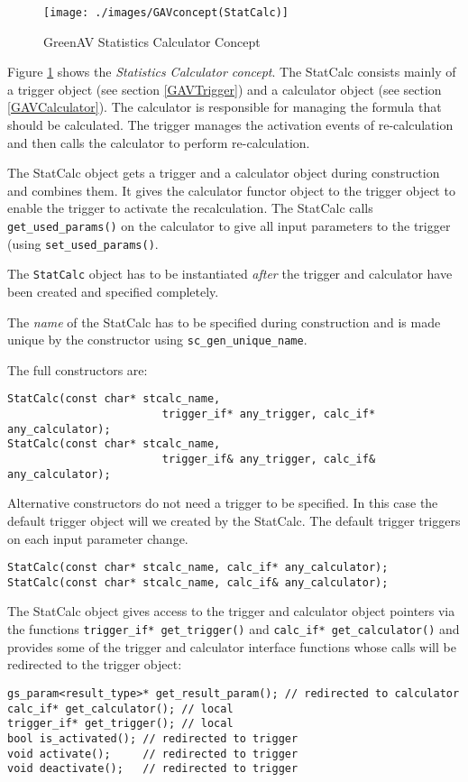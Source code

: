 \begin{figure}[htbp]
	\centerline{
		\texttt{[image: ./images/GAVconcept(StatCalc)]}}
	\caption{GreenAV Statistics Calculator Concept}
	\label{fig:GAVConceptStatCalc}
\end{figure}

Figure \ref{fig:GAVConceptStatCalc} shows the {\em Statistics Calculator concept}. The StatCalc consists mainly of a trigger object (see section \ref{GAVTrigger}) and a calculator object (see section \ref{GAVCalculator}). The calculator is responsible for managing the formula that should be calculated. The trigger manages the activation events of re-calculation and then calls the calculator to perform re-calculation.

The StatCalc object gets a trigger and a calculator object during construction and combines them. It gives the calculator functor object to the trigger object to enable the trigger to activate the recalculation. The StatCalc calls \lstinline|get_used_params()| on the calculator to give all input parameters to the trigger (using \lstinline|set_used_params()|.

The \lstinline|StatCalc| object has to be instantiated {\em after} the trigger and calculator have been created and specified completely.

The {\em name} of the StatCalc has to be specified during construction and is made unique by the constructor using \lstinline|sc_gen_unique_name|.

The full constructors are:
\begin{lstlisting}
StatCalc(const char* stcalc_name, 
                        trigger_if* any_trigger, calc_if* any_calculator);
StatCalc(const char* stcalc_name, 
                        trigger_if& any_trigger, calc_if& any_calculator);
\end{lstlisting}

Alternative constructors do not need a trigger to be specified. In this case the default trigger object will we created by the StatCalc. The default trigger triggers on each input parameter change.
\begin{lstlisting}
StatCalc(const char* stcalc_name, calc_if* any_calculator);
StatCalc(const char* stcalc_name, calc_if& any_calculator);
\end{lstlisting}

The StatCalc object gives access to the trigger and calculator object pointers via the functions \lstinline|trigger_if* get_trigger()| and \lstinline|calc_if* get_calculator()| and provides some of the trigger and calculator interface functions whose calls will be redirected to the trigger object:
\begin{lstlisting}
gs_param<result_type>* get_result_param(); // redirected to calculator
calc_if* get_calculator(); // local
trigger_if* get_trigger(); // local
bool is_activated(); // redirected to trigger
void activate();     // redirected to trigger
void deactivate();   // redirected to trigger
\end{lstlisting}

